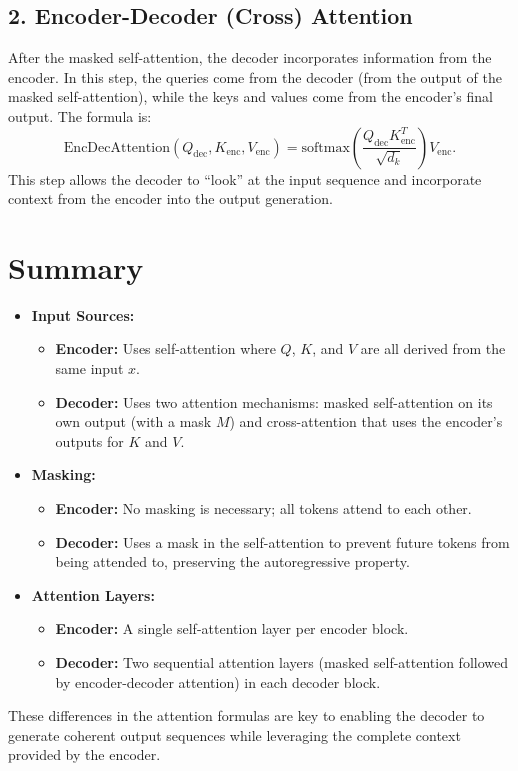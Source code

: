 \documentclass{article}
\begin{document}
\subsection*{2. Encoder-Decoder (Cross) Attention}
After the masked self-attention, the decoder incorporates information from the encoder. In this step, the queries come from the decoder (from the output of the masked self-attention), while the keys and values come from the encoder’s final output. The formula is:
\[
\text{EncDecAttention}(Q_{\text{dec}}, K_{\text{enc}}, V_{\text{enc}}) = \text{softmax}\!\left(\frac{Q_{\text{dec}} K_{\text{enc}}^T}{\sqrt{d_k}}\right)V_{\text{enc}}.
\]
This step allows the decoder to ``look'' at the input sequence and incorporate context from the encoder into the output generation.

\section*{Summary}

\begin{itemize}[noitemsep]
    \item \textbf{Input Sources:}
    \begin{itemize}[noitemsep]
        \item \textbf{Encoder:} Uses self-attention where \( Q \), \( K \), and \( V \) are all derived from the same input \( x \).
        \item \textbf{Decoder:} Uses two attention mechanisms: masked self-attention on its own output (with a mask \( M \)) and cross-attention that uses the encoder's outputs for \( K \) and \( V \).
    \end{itemize}
    \item \textbf{Masking:}
    \begin{itemize}[noitemsep]
        \item \textbf{Encoder:} No masking is necessary; all tokens attend to each other.
        \item \textbf{Decoder:} Uses a mask in the self-attention to prevent future tokens from being attended to, preserving the autoregressive property.
    \end{itemize}
    \item \textbf{Attention Layers:}
    \begin{itemize}[noitemsep]
        \item \textbf{Encoder:} A single self-attention layer per encoder block.
        \item \textbf{Decoder:} Two sequential attention layers (masked self-attention followed by encoder-decoder attention) in each decoder block.
    \end{itemize}
\end{itemize}

These differences in the attention formulas are key to enabling the decoder to generate coherent output sequences while leveraging the complete context provided by the encoder.
\end{document}

